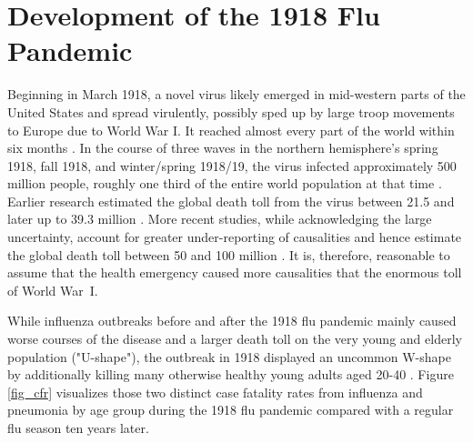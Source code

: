 \documentclass[12pt,a4paper]{article}
\begin{document}
\section{Development of the 1918 Flu Pandemic}


Beginning in March 1918, a novel virus likely emerged in mid-western parts of the United States \citep{barrySiteOrigin19182004} and spread virulently, possibly sped up by large troop movements to Europe due to World War I.
It reached almost every part of the world within six months \citep{pattersonGeographyMortality19181991}.
In the course of three waves in the northern hemisphere's spring 1918, fall 1918, and winter/spring 1918/19, the virus infected approximately 500 million people, roughly one third of the entire world population at that time \citep{taubenberger1918InfluenzaMother2006}.
Earlier research estimated the global death toll from the virus between 21.5 \citep{jordanEpidemicInfluenzaSurvey1927} and later up to 39.3 million \citep{pattersonGeographyMortality19181991}.
More recent studies, while acknowledging the large uncertainty, account for greater under-reporting of causalities and hence estimate the global death toll between 50 and 100 million \citep{johnsonUpdatingAccountsGlobal2002}.
It is, therefore, reasonable to assume that the health emergency caused more causalities that the enormous toll of World War~I.

While influenza outbreaks before and after the 1918 flu pandemic mainly caused worse courses of the disease and a larger death toll on the very young and elderly population ("U-shape"),
the outbreak in 1918 displayed an uncommon W-shape by additionally killing many otherwise healthy young adults aged 20-40 \citep{taubenberger1918InfluenzaMother2006}.
Figure \ref{fig_cfr} visualizes those two distinct case fatality rates from influenza and pneumonia by age group during the 1918 flu pandemic compared with a regular flu season ten years later.
\end{document}
